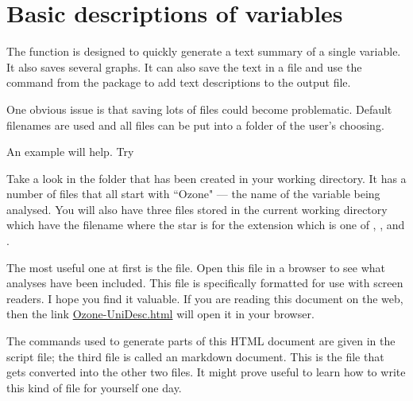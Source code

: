  
\section{Basic descriptions of variables} 
 
The  function is designed to quickly generate a text summary of a single variable. It also saves several graphs. It can also save the text in a file and use the  command from the  package to add text descriptions to the output file. 
 
One obvious issue is that saving lots of files could become problematic. Default filenames are used and all files can be put into a folder of the user's choosing. 
 
An example will help. Try 
\begin{knitrout}
\color{fgcolor}\begin{kframe}
\begin{alltt}
\hlstd{> }
\hlstd{> }\hlkwb{=}\hlopt{$}
\hlstd{> } \hlstd{=}\hlstd{)}
\end{alltt}
\end{kframe}
\end{knitrout}
Take a look in the  folder that has been created in your working directory. It has a number of files that all start with ``Ozone" --- the name of the variable being analysed.  You will also have three files stored in the current working directory which have the filename  where the star is for the extension which is one of , , and . 
 
The most useful one at first is the  file. Open this file in a browser to see what analyses have been included. This file is specifically formatted for use with screen readers. I hope you find it valuable. If you are reading this document on the web, then the link \url{Ozone-UniDesc.html} will open it in your browser.  
 
The commands used to generate parts of this HTML document are given in the \R{} script file; the third file is called an \R{} markdown document. This is the file that gets converted into the other two files. It might prove useful to learn how to write this kind of file for yourself one day. 
 
